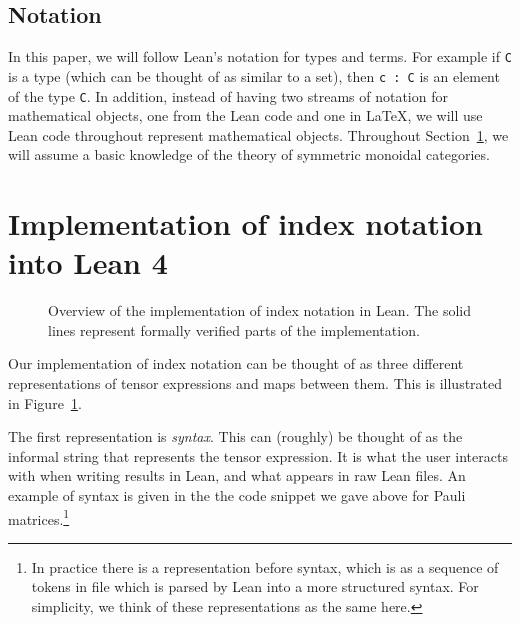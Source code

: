 \documentclass[a4paper, 11pt]{article}
\DeclareRobustCommand{\myinline}{\lstinline}
\begin{document}
\subsection*{Notation}
In this paper, we will follow Lean's notation for types and terms. 
For example if \myinline|C| is a type (which can be thought of as similar to a set),
then \myinline|c : C| is an element of the type \myinline|C|. 
In addition, instead of having two streams of notation for mathematical objects, one from the Lean 
code and one in LaTeX, we will use Lean code throughout represent mathematical objects.
Throughout Section~\ref{sec:Implementation}, we will assume a basic knowledge of the theory of 
symmetric monoidal categories.
\section{Implementation of index notation into Lean 4}\label{sec:Implementation}

\begin{figure}
  \centering
  \caption{Overview of the implementation of index notation in Lean. The 
  solid lines represent formally verified parts of the implementation.}
  \label{fig:overviewFlow}
\end{figure}

Our implementation of index notation can be thought of as three different representations of tensor 
expressions and maps between them. This is illustrated in Figure~\ref{fig:overviewFlow}.

The first representation is \emph{syntax}. This can (roughly) be thought of as the informal string
that represents the tensor expression. It is what the user interacts with when 
writing results in Lean, and what appears in raw Lean files. 
An example of syntax is given in the the code snippet we gave above 
for Pauli matrices.\footnote{In practice there is a representation before syntax, 
 which is as a sequence of tokens in file which is parsed by Lean into a more structured syntax. For simplicity,
 we think of these representations as the same here.} 
\end{document}
